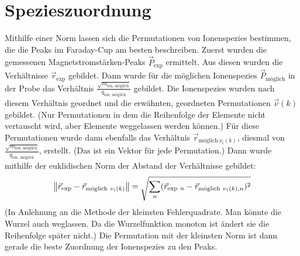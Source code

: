 \section{Spezieszuordnung}
\label{Appendix_Normen}
Mithilfe einer Norm lassen sich die Permutationen von Ionenspezies bestimmen, die die Peaks im Faraday-Cup am besten beschreiben.
Zuerst wurden die gemessenen Magnetstromstärken-Peaks $\vec{P}_{\text{exp}}$ ermittelt.
Aus diesen wurden die Verhältnisse $\vec{r}_{\text{exp}}$ gebildet.
Dann wurde für die möglichen Ionenspezies $\vec{P}_{\text{möglich}}$ in der Probe das Verhältnis $\frac{\sqrt{m_{\text{ion, möglich}}}}{q_{\text{ion, möglich}}}$ gebildet.
Die Ionenspezies wurden nach diesem Verhältnis geordnet und die erwähnten, geordneten Permutationen $\vec{\nu}(k)$ gebildet.
(Nur Permutationen in dem die Reihenfolge der Elemente nicht vertauscht wird, aber Elemente weggelassen werden können.)
Für diese Permutationen wurde dann ebenfalls das Verhältnis $\vec{r}_{\text{möglich}\ \nu_{i}(k)}$, diesmal von $\frac{\sqrt{m_{\text{ion, möglich}}}}{q_{\text{ion, möglich}}}$, erstellt.
(Das ist ein Vektor für jede Permutation.)
Dann wurde mithilfe der euklidischen Norm der \glqq Abstand\grqq{} der Verhältnisse gebildet:
\begin{gather}
    \norm{\vec{r}_{\text{exp}}-\vec{r}_{\text{möglich}\ \nu_{i}(k)}} = \sqrt{\sum_{n}(\vec{r}_{\text{exp}\ n}-\vec{r}_{\text{möglich}\ \nu_{i}(k),n})^{2}}
\end{gather}
(In Anlehnung an die Methode der kleinsten Fehlerquadrate. Man könnte die Wurzel auch weglassen. Da die Wurzelfunktion monoton ist ändert sie die Reihenfolge später nicht.)
Die Permutation mit der kleinsten Norm ist dann gerade die beste Zuordnung der Ionenspezies zu den Peaks.

